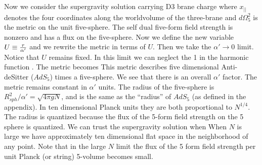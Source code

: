 Now we consider the supergravity solution carrying D3 brane charge 
 \hstro
\eqn{}
where $x_{||}$ denotes the four coordinates along the worldvolume of
the three-brane and $d\Omega^2_5$ is the metric on the unit five-sphere.
The self dual five-form field strength is nonzero and has a flux on the 
five-sphere.  
Now we define the new variable $U \equiv {r \over \alpha'}$ and
we rewrite the metric in terms of $U$. Then we take the $\alpha' \to 0$
limit. Notice that  $U$ remains fixed.
In this  limit we can neglect the
1 in the harmonic function \dthree .
The metric becomes 
\eqn{}
This metric describes  five dimensional Anti-deSitter 
 ($AdS_5$) times 
a five-sphere.
We see that there is an overall $\alpha'$ factor. 
The metric remains constant in $\alpha'$ units. The radius
of the five-sphere is $R^2_{sph}/\alpha' = \sqrt{4\pi g N} $, and  is the 
same as the ``radius'' of $AdS_5$ (as defined in the appendix). 
In ten dimensional Planck units they are both proportional to $N^{1/4}$.
The radius is quantized because the flux of the 5-form field strength on the
5 sphere is quantized.  We can trust the supergravity solution when
\eqn{}
When  $N$ is  large  we have  approximately 
ten dimensional  flat space in the
  neighborhood of any  point. 
Note that in the large $N$ limit the flux of the 5 form field strength
per unit Planck (or string) 5-volume becomes small. 

  




